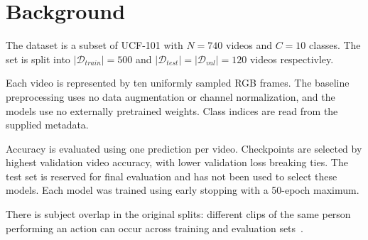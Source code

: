 \section{Background}
\label{sec:background}

The dataset is a subset of UCF-101 with $N=740$ videos and $C=10$ classes. The set is split into $|\mathcal{D}_{train}| = 500$ and $|\mathcal{D}_{test}| = |\mathcal{D}_{val}| = 120$ videos respectivley.

Each video is represented by ten uniformly sampled RGB frames. The baseline preprocessing uses no data
augmentation or channel normalization, and the models use no externally
pretrained weights. Class indices are read from the supplied metadata.

Accuracy is evaluated using one prediction per video.
Checkpoints are selected by highest validation video accuracy, with lower
validation loss breaking ties. The test set is reserved for final evaluation
and has not been used to select these models. Each model was trained using early stopping with a 50-epoch maximum.

There is subject overlap in the original splits:
different clips of the same person performing an action can occur across
training and evaluation sets~\cite{course2026}.